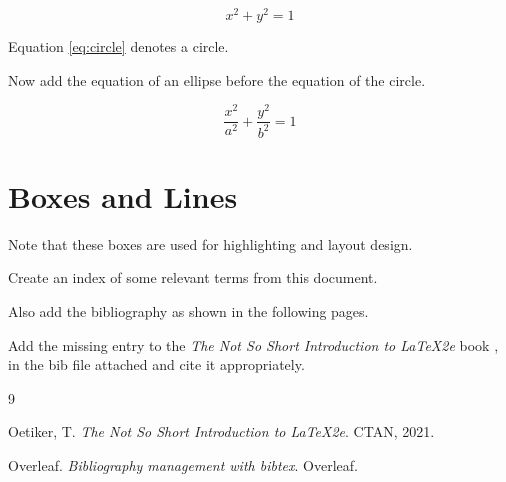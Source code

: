 \documentclass[12pt,a4paper]{article}
\begin{document}
	\begin{equation}
		x^2+y^2=1
		\label{eq:circle}
	\end{equation}
	
	Equation \ref{eq:circle} denotes a circle.
	
	Now add the equation of an ellipse before the equation of the circle.
	
	\begin{equation}
		\frac{x^2}{a^2}+\frac{y^2}{b^2}=1
		\label{eq:ellipse}
	\end{equation}
	
	
	\section{Boxes and Lines}
	
	
	
	
	\usebox{\boxone}
	
	\vspace{0.5cm}
	
	\usebox{\boxtwo}
	
	\vspace{0.5cm}
	
	\usebox{\boxthree}
	
	\vspace{0.7cm}
	
	\noindent
	
	\vspace{0.5cm}
	
	Note that these boxes are used for highlighting and layout design.
	
	
	\vfill
	
	Create an index of some relevant terms from this document.
	
	Also add the bibliography \cite{overleafbib} as shown in the
	following pages.
	
	Add the missing entry to the
	\textit{The Not So Short Introduction to \LaTeX2e}
	book \cite{latexshort}, in the bib file attached and cite it
	appropriately.
	
	\newpage
	
	\printindex
	
	\newpage
	
	\begin{thebibliography}{9}
		
		Oetiker, T.
		\textit{The Not So Short Introduction to \LaTeX2e}.
		CTAN, 2021.
		
		Overleaf.
		\textit{Bibliography management with bibtex}.
		Overleaf.
		
	\end{thebibliography}
	
\end{document}
